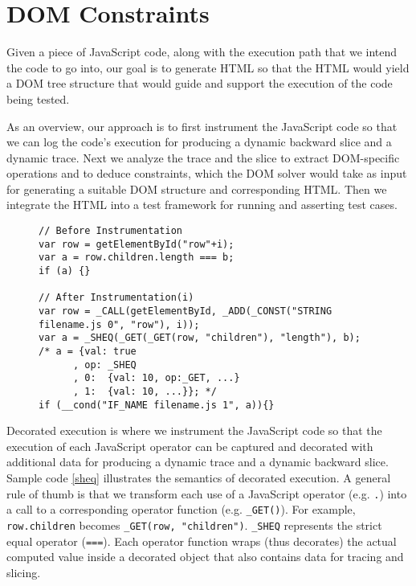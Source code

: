 \section{DOM Constraints}
Given a piece of JavaScript code, along with the execution path that we intend the code to go into, 
our goal is to generate HTML so that the HTML would yield a DOM tree structure that would guide and support the execution of the code being tested.  

As an overview, our approach is to first instrument the JavaScript code so that we can log the code's execution for producing a dynamic backward slice and a dynamic trace.  
Next we analyze the trace and the slice to extract DOM-specific operations and to deduce constraints, which the DOM solver would take as input for generating a suitable DOM structure and corresponding HTML.  
Then we integrate the HTML into a test framework for running and asserting test cases.  

\begin{figure}
\begin{lstlisting}[caption=Example showing how code is instrumented for dynamic analysis.  The comment at line 9 shows the decorated object {\tt a} and its nested tree data structure.  
{\tt a}'s actual value is {\tt true} because both left and right hand side have the same value 10: {\tt line 11} and {\tt line 12},label=sheq]  
// Before Instrumentation
var row = getElementById("row"+i);
var a = row.children.length === b; 
if (a) {}

// After Instrumentation(i)
var row = _CALL(getElementById, _ADD(_CONST("STRING filename.js 0", "row"), i));
var a = _SHEQ(_GET(_GET(row, "children"), "length"), b);
/* a = {val: true
      , op:	_SHEQ
      , 0:	{val: 10, op:_GET, ...}
      , 1:	{val: 10, ...}}; */
if (__cond("IF_NAME filename.js 1", a)){}
\end{lstlisting}
\end{figure}

Decorated execution is where we instrument the JavaScript code so that the execution of each JavaScript operator can be captured and decorated with additional data for producing a dynamic trace and a dynamic backward slice.  
Sample code \ref{sheq} illustrates the semantics of decorated execution.  
A general rule of thumb is that we transform each use of a JavaScript operator (e.g. {\tt .}) into a call to a corresponding operator function (e.g. {\tt \_GET()}).  
For example, {\tt row.children} becomes {\tt \_GET(row, "children")}.  {\tt \_SHEQ} represents the strict equal operator ({\tt ===}).  
Each operator function wraps (thus decorates) the actual computed value inside a decorated object that also contains data for tracing and slicing.   

